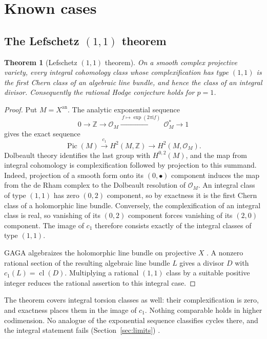 \documentclass[11pt,reqno]{amsart}
\newtheorem{theorem}{Theorem}[section]
\theoremstyle{definition}
\theoremstyle{remark}
\numberwithin{equation}{section}
\newcommand{\Z}{\mathbb{Z}}
\newcommand{\OO}{\mathcal{O}}
\newcommand{\an}{\mathrm{an}}
\newcommand{\ii}{\mathrm{i}}
\DeclareMathOperator{\cl}{cl}
\DeclareMathOperator{\Pic}{Pic}
\begin{document}
\section{Known cases}\label{sec:known}

\subsection{The Lefschetz \texorpdfstring{$(1,1)$}{(1,1)} theorem}

\begin{theorem}[Lefschetz $(1,1)$ theorem]\label{thm:11}
On a smooth complex projective variety, every integral cohomology class
whose complexification has type $(1,1)$ is the first Chern class of an
algebraic line bundle, and hence the class of an integral divisor.
Consequently the rational Hodge conjecture holds for $p=1$.
\end{theorem}

\begin{proof}
Put $M=X^{\an}$. The analytic exponential sequence
\[
 0\longrightarrow\Z\longrightarrow\OO_M
 \xrightarrow{\ f\mapsto\exp(2\pi\ii f)\ }\OO_M^*
 \longrightarrow1
\]
gives the exact sequence
\[
 \Pic(M)\xrightarrow{\ c_1\ }H^2(M,\Z)\longrightarrow H^2(M,\OO_M).
\]
Dolbeault theory identifies the last group with $H^{0,2}(M)$, and the map
from integral cohomology is complexification followed by projection to this
summand. Indeed, projection of a smooth form onto its $(0,\bullet)$
component induces the map from the de Rham complex to the Dolbeault
resolution of $\OO_M$. An integral class of type $(1,1)$ has zero $(0,2)$
component, so by exactness it is the first Chern class of a holomorphic
line bundle. Conversely, the complexification of an integral class is real,
so vanishing of its $(0,2)$ component forces vanishing of its $(2,0)$
component. The image of $c_1$ therefore consists exactly of the integral
classes of type $(1,1)$.

GAGA algebraizes the holomorphic line bundle on projective $X$
\cite{serre1956gaga,gaganotes}. A nonzero rational section of the resulting
algebraic line bundle $L$ gives a divisor $D$ with
$c_1(L)=\cl(D)$. Multiplying a rational $(1,1)$ class by a suitable
positive integer reduces the rational assertion to this integral case.
\end{proof}

The theorem covers integral torsion classes as well: their complexification
is zero, and exactness places them in the image of $c_1$. Nothing comparable
holds in higher codimension. No analogue of the exponential sequence
classifies cycles there, and the integral statement fails
(Section~\ref{sec:limits}) \cite{voisin2002hodge}.
\end{document}
